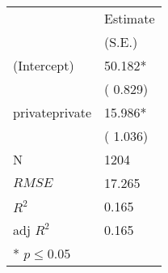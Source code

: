 \begin{center}
 \begin{tabular}{*{2}{l}}
 \hline
               & Estimate  \\
              & (S.E.)  \\
\hline 
 \hline
  (Intercept)   &    50.182* \\
    &   ( 0.829) \\
  privateprivate   &    15.986* \\
    &   ( 1.036) \\
 \hline 
N   &    1204 \\
 $RMSE$       & 17.265  \\
 $R^2$       & 0.165  \\
 adj $R^2$       & 0.165  \\
 \hline\hline
* $p \le 0.05$\end{tabular}
\end{center}